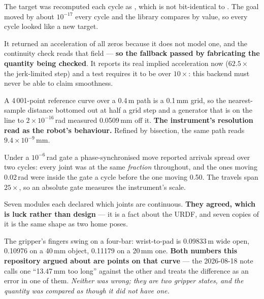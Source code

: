 {The target was recomputed each cycle as , which
is not bit-identical to . The goal moved by about $10^{-17}$ every
cycle and the library compares by value, so every cycle looked like a new
target.}

{It returned an acceleration of all zeros because it does not model one, and the
continuity check reads that field --- \textbf{so the fallback passed by
fabricating the quantity being checked}. It reports its real implied
acceleration now ($62.5\times$ the jerk-limited step) and a test requires it to
be over $10\times$: this backend must never be able to claim smoothness.}

{A 4\,001-point reference curve over a 0.4\,m path is a 0.1\,mm grid, so the
nearest-sample distance bottomed out at half a grid step and a generator that is
on the line to $2\times10^{-16}$\,rad measured 0.0509\,mm off it.
\textbf{The instrument's resolution read as the robot's behaviour.} Refined by
bisection, the same path reads $9.4\times10^{-9}$\,mm.}

{Under a $10^{-6}$\,rad gate a phase-synchronised move reported arrivals spread
over two cycles: every joint was at the same \emph{fraction} throughout, and the
ones moving 0.02\,rad were inside the gate a cycle before the one moving 0.50.
The travels span $25\times$, so an absolute gate measures the instrument's
scale.}

{Seven modules each declared which joints are continuous. \textbf{They agreed,
which is luck rather than design} --- it is a fact about the URDF, and seven
copies of it is the same shape as two home poses.}

{The gripper's fingers swing on a four-bar: wrist-to-pad is 0.09833\,m wide open,
0.10976 on a 40\,mm object, 0.11179 on a 20\,mm one. \textbf{Both numbers this
repository argued about are points on that curve} --- the 2026-08-18 note calls
one ``13.47\,mm too long'' against the other and treats the difference as an
error in one of them. \emph{Neither was wrong; they are two gripper states, and
the quantity was compared as though it did not have one.}}

